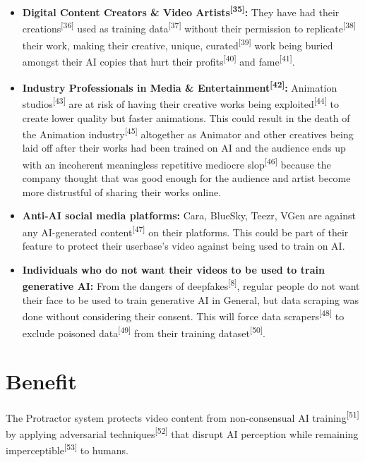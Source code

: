 \begin{itemize}
    \item \textbf{Digital Content Creators \& Video Artists\textsuperscript{[35]}:} They have had their creations\textsuperscript{[36]} used as training data\textsuperscript{[37]} without their permission to replicate\textsuperscript{[38]} their work, making their creative, unique, curated\textsuperscript{[39]} work being buried amongst their AI copies that hurt their profits\textsuperscript{[40]} and fame\textsuperscript{[41]}.
    \item \textbf{Industry Professionals in Media \& Entertainment\textsuperscript{[42]}:} Animation studios\textsuperscript{[43]} are at risk of having their creative works being exploited\textsuperscript{[44]} to create lower quality but faster animations. This could result in the death of the Animation industry\textsuperscript{[45]} altogether as Animator and other creatives being laid off after their works had been trained on AI and the audience ends up with an incoherent meaningless repetitive mediocre slop\textsuperscript{[46]} because the company thought that was good enough for the audience and artist become more distrustful of sharing their works online.

    \item \textbf{Anti-AI social media platforms:} Cara, BlueSky, Teezr, VGen are against any AI-generated content\textsuperscript{[47]} on their platforms. This could be part of their feature to protect their userbase’s video against being used to train on AI.
    \item \textbf{Individuals who do not want their videos to be used to train generative AI:} From the dangers of deepfakes\textsuperscript{[8]}, regular people do not want their face to be used to train generative AI in General, but data scraping was done without considering their consent. This will force data scrapers\textsuperscript{[48]} to exclude poisoned data\textsuperscript{[49]} from their training dataset\textsuperscript{[50]}.
\end{itemize}

\section{Benefit}
\label{section:benefit}
The Protractor system protects video content from non-consensual AI training\textsuperscript{[51]} by applying adversarial techniques\textsuperscript{[52]} that disrupt AI perception while remaining imperceptible\textsuperscript{[53]} to humans.

